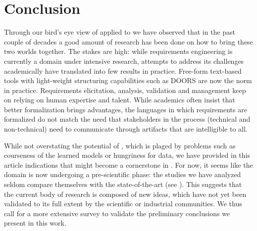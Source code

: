 \section{Conclusion}

Through our bird's eye view of \ML applied to \RE we have observed that in the
past couple of decades a good amount of research has been done on how to bring
these two worlds together. The stakes are high: while requirements engineering
is currently a domain under intensive research, attempts to address its
challenges academically have translated into few results in practice. Free-form
text-based tools with light-weight structuring capabilities such as DOORS are
now the norm in practice. Requirements elicitation, analysis, validation and
management keep on relying on human expertise and talent. While academics often insist that
better formalization brings advantages, the languages in which requirements are
formalized do not match the need that stakeholders in the \RE process
(technical and non-technical) need to communicate through artifacts that are
intelligible to all.

While not overstating the potential of \ML, which is plaged by problems such as
courseness of the learned models or hungriness for data, we have provided in
this article indications that \ML might become a cornerstone in \RE. For now, it
seems like the domain is now undergoing a pre-scientific phase: the studies we
have analyzed seldom compare themselves with the state-of-the-art (see
). This suggests that the current body of research is composed of
new ideas, which have not yet been validated to its full extent by the
scientific or industrial communities. We thus call for a more extensive survey to validate
the preliminary conclusions we present in this work.
